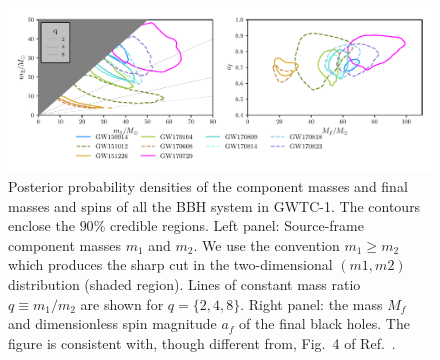 \begin{figure}[t]
	\centering
    \includegraphics[width=\textwidth]{img/posterior_masses_final_seob.pdf}
	\caption{
	Posterior probability densities of the component masses and final masses and spins 
	of all the BBH system in GWTC-1. The contours enclose the $90\%$ credible regions.
	Left panel: Source-frame component masses $m_1$ and $m_2$. We use the convention $m_1\geq m_2$ which 
	produces the sharp cut in the two-dimensional $(m1,m2)$ distribution (shaded region). Lines of
	constant mass ratio $q\equiv m_1/m_2$ are shown for $q=\{2,4,8\}$. Right panel: the mass $M_f$
	and dimensionless spin magnitude $a_f$ of the final black holes. The figure is consistent with, though 
	different from, Fig.~4 of Ref.~\cite{LIGOScientific:2018mvr}.
}
	\label{fig:gwtc1-summary}
\end{figure}


